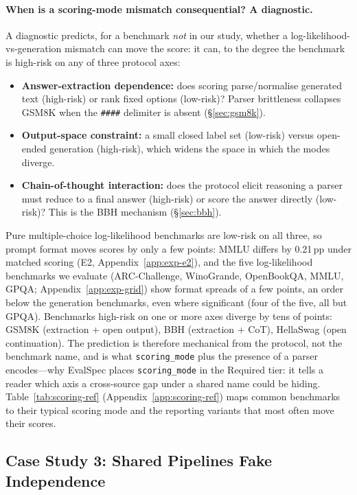 \documentclass[11pt]{article}
\begin{document}
\paragraph{When is a scoring-mode mismatch consequential? A diagnostic.}
A diagnostic
predicts, for a benchmark \emph{not} in our study, whether a
log-likelihood-vs-generation mismatch can move the score: it can, to the degree the
benchmark is high-risk on any of three protocol axes:
\begin{itemize}
\item \textbf{Answer-extraction dependence:} does scoring parse/normalise generated
text (high-risk) or rank fixed options (low-risk)? Parser brittleness collapses
GSM8K when the \texttt{\#\#\#\#} delimiter is absent (\S\ref{sec:gsm8k}).
\item \textbf{Output-space constraint:} a small closed label set (low-risk) versus
open-ended generation (high-risk), which widens the space in which the modes diverge.
\item \textbf{Chain-of-thought interaction:} does the protocol elicit reasoning a
parser must reduce to a final answer (high-risk) or score the answer directly
(low-risk)? This is the BBH mechanism (\S\ref{sec:bbh}).
\end{itemize}
Pure multiple-choice log-likelihood benchmarks are low-risk on all three, so
prompt format moves scores by only a few points: MMLU differs by 0.21\,pp under
matched scoring (E2, Appendix~\ref{app:exp-e2}), and the five log-likelihood
benchmarks we evaluate (ARC-Challenge, WinoGrande, OpenBookQA, MMLU, GPQA;
Appendix~\ref{app:exp-grid}) show format spreads of a few points, an order below
the generation benchmarks, even where significant (four of the five, all but
GPQA). Benchmarks high-risk on one or more axes diverge by tens of points: GSM8K
(extraction + open output), BBH (extraction + CoT), HellaSwag (open continuation).
The prediction is therefore mechanical from the protocol, not the benchmark name,
and is what \texttt{scoring\_mode} plus the presence of a parser encodes---why
EvalSpec places \texttt{scoring\_mode} in the Required tier: it tells a reader
which axis a cross-source gap under a shared name could be hiding.
Table~\ref{tab:scoring-ref}
(Appendix~\ref{app:scoring-ref}) maps common benchmarks to their typical scoring
mode and the reporting variants that most often move their scores.

\subsection{Case Study 3: Shared Pipelines Fake Independence}
\label{sec:convergence}\label{sec:sealion}
\end{document}
